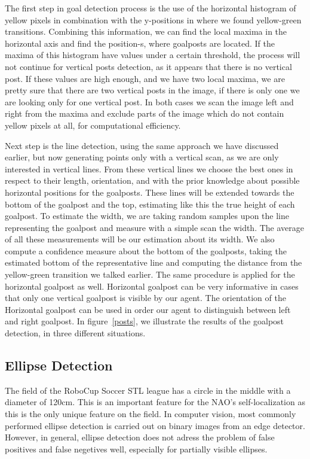 \documentclass[	DIV=calc,%
							paper=a4,%
							fontsize=9pt,%
							twocolumn]{scrartcl}	 					%
\begin{document}
The first step in goal detection process is the use of the horizontal histogram of yellow pixels in combination with the y-positions in where we found yellow-green transitions. Combining this information, we can find the local maxima in the horizontal axis and find the position-s, where goalposts are located. If the maxima of this histogram have values under a certain threshold, the process will not continue for vertical posts detection, as it appears that there is no vertical post. If these values are high enough, and we have two local maxima, we are pretty sure that there are two vertical posts in the image, if there is only one we are looking only for one vertical post. In both cases we scan the image left and right from the maxima and exclude parts of the image which do not contain yellow pixels at all, for computational efficiency.

Next step is the line detection, using the same approach we have discussed earlier, but now generating points only with a vertical scan, as we are only interested in vertical lines. From these vertical lines we choose the best ones in respect to their length, orientation, and with the prior knowledge about possible horizontal positions for the goalposts. These lines will be extended towards the bottom of the goalpost and the top, estimating like this the true height of each goalpost. To estimate the width, we are taking random samples upon the line representing the goalpost and measure with a simple scan the width. The average of all these measurements will be our estimation about its width. We also compute a confidence measure about the bottom of the goalposts, taking the estimated bottom of the representative line and computing the distance from the yellow-green transition we talked earlier. The same procedure is applied for the horizontal goalpost as well. Horizontal goalpost can be very informative in cases that only one vertical goalpost is visible by our agent. The orientation of the Horizontal goalpost can be used in order our agent to distinguish between left and right goalpost. In figure~\ref{posts}, we illustrate the results of the goalpost detection, in three different situations.

\subsection{Ellipse Detection}
The field of the RoboCup Soccer STL league has a circle in the middle with a diameter of 120cm. This is an important feature for the NAO's self-localization as this is the only unique feature on the field. In computer vision, most commonly performed ellipse detection is carried out on binary images from an edge detector. However, in general, ellipse detection does not adress the problem of false positives and false negetives well, especially for partially visible ellipses.
\end{document}
